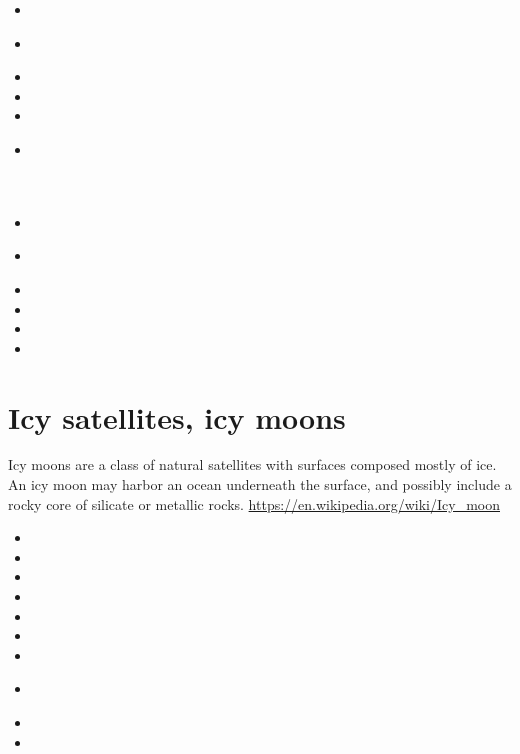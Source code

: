 \begin{small}
\begin{itemize}
\item[\twothousandsix]
\item[\twothousandeleven]
  \\
\item[\twothousandtwelve]
\item[\twothousandthirteen]
\item[\twothousandfourteen]
\item[\twothousandfifteen] 
  \\
  \\
  \\
\item[\twothousandseventeen] 
\item[\twothousandeighteen] 
 \\
\item[\twothousandtwentyone]
\item[\twothousandtwentytwo]
\item[\twothousandtwentythree] 
\item[\twothousandtwentyfive] 
\end{itemize}
\end{small}

\section{Icy satellites, icy moons}

Icy moons are a class of natural satellites with surfaces composed mostly of ice. 
An icy moon may harbor an ocean underneath the surface, and possibly include a rocky 
core of silicate or metallic rocks.
\url{https://en.wikipedia.org/wiki/Icy_moon}

\begin{small}
\begin{itemize}
\item[1987]
\item[1988]
\item[\twothousandone] 
\item[\twothousandtwelve] 
\item[\twothousandseventeen] 
\item[\twothousandnineteen] 
\item[\twothousandtwenty] 
\item[\twothousandtwentyone]
 \\ 
\item[\twothousandtwentythree]
\item[2025]
\end{itemize}
\end{small}

